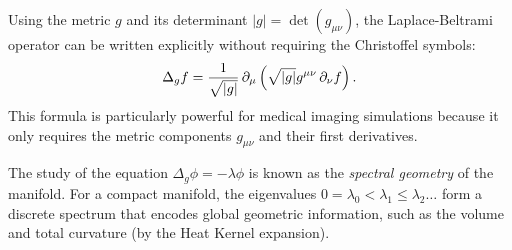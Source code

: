 Using the metric $g$ and its determinant $|g| = \det(g_{\mu\nu})$, the Laplace-Beltrami operator can be written explicitly without requiring the Christoffel symbols:
\begin{equation}
  \Delta_g f = \frac{1}{\sqrt{|g|}} \pd{\mu} \left( \sqrt{|g|} g^{\mu\nu} \pd{\nu} f \right)
.\end{equation}
This formula is particularly powerful for medical imaging simulations because it only requires the metric components $g_{\mu\nu}$ and their first derivatives.

The study of the equation $\Delta_g \phi = -\lambda \phi$ is known as the \emph{spectral geometry} of the manifold. For a compact manifold, the eigenvalues $0 = \lambda_0 < \lambda_1 \leq \lambda_2 \dots$ form a discrete spectrum that encodes global geometric information, such as the volume and total curvature (by the Heat Kernel expansion).
